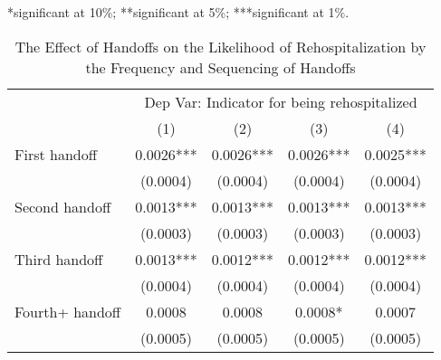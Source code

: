 \documentclass[final,12pt, notitlepage]{article}
\begin{document}
\begin{singlespace}
\begin{table}[H]
\begin{threeparttable}
\begin{tablenotes}
	*significant at 10\%; **significant at 5\%; ***significant at 1\%.
	\end{tablenotes}
\end{threeparttable}
\end{table}




\begin{table}[H]
\footnotesize
\setlength\tabcolsep{0pt}
\centering
\caption{The Effect of Handoffs on the Likelihood of Rehospitalization by the Frequency and Sequencing of Handoffs}
\label{tab:ols_mechanism}
\begin{threeparttable}
\begin{tabular*}{\textwidth}{l@{\extracolsep{\fill}}*{4}{c}} %
\toprule
& \multicolumn{4}{c}{Dep Var: Indicator for being rehospitalized} \\
 & (1) & (2) & (3) & (4) \\
\midrule
First handoff & 0.0026*** & 0.0026*** & 0.0026*** & 0.0025*** \\
 & (0.0004) & (0.0004) & (0.0004) & (0.0004) \\
Second handoff & 0.0013*** & 0.0013*** & 0.0013*** & 0.0013*** \\
 & (0.0003) & (0.0003) & (0.0003) & (0.0003) \\
Third handoff & 0.0013*** & 0.0012*** & 0.0012*** & 0.0012*** \\
 & (0.0004) & (0.0004) & (0.0004) & (0.0004) \\
Fourth+ handoff & 0.0008 & 0.0008 & 0.0008* & 0.0007 \\
 & (0.0005) & (0.0005) & (0.0005) & (0.0005) \\

\end{tabular*}
\end{threeparttable}
\end{table}
\end{singlespace}
\end{document}
